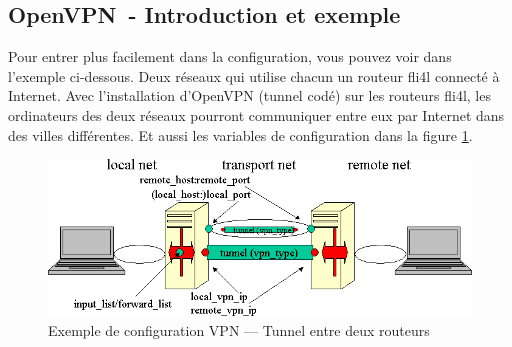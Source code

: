 \subsection{OpenVPN~- Introduction et exemple}

Pour entrer plus facilement dans la configuration, vous pouvez voir dans l'exemple
ci-dessous. Deux réseaux qui utilise chacun un routeur fli4l connecté à Internet.
Avec l'installation d'OpenVPN (tunnel codé) sur les routeurs fli4l, les ordinateurs
des deux réseaux pourront communiquer entre eux par Internet dans des villes différentes.
Et aussi les variables de configuration dans la figure \ref{fig:tunnel}.

  \begin{figure}[htbp]
    \centering
    \includegraphics[width=\columnwidth]{openvpn-sample}
    \caption{Exemple de configuration VPN --- Tunnel entre deux routeurs}
    \label{fig:tunnel}
  \end{figure}

